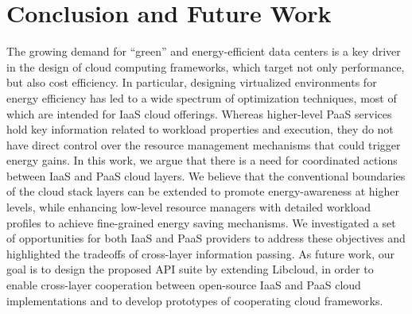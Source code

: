 \section{Conclusion and Future Work}
\label{sec: conclusion}

The growing demand for “green” and energy-efficient data centers is a key driver in the design of cloud computing frameworks, which target not only performance, but also cost efficiency. In particular, designing virtualized environments for energy efficiency has led to a wide spectrum of optimization techniques, most of which are intended for IaaS cloud offerings. Whereas higher-level PaaS services hold key information related to workload properties and execution, they do not have direct control over the resource management mechanisms that could trigger energy gains. In this work, we argue that there is a need for coordinated actions between IaaS and PaaS cloud layers. We believe that the conventional boundaries of the cloud stack layers can be extended to promote energy-awareness at higher levels, while enhancing low-level resource managers with detailed workload profiles to achieve fine-grained energy saving mechanisms.
We investigated a set of opportunities for both IaaS and PaaS providers to address these objectives and highlighted the tradeoffs of cross-layer information passing. As future work, our goal is to design the proposed API suite by extending Libcloud, in order to enable cross-layer cooperation between open-source IaaS and PaaS cloud implementations and to develop prototypes of cooperating cloud frameworks.